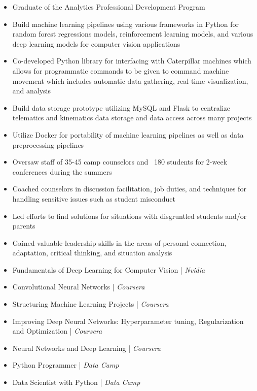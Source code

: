 \documentclass[10pt,a4paper]{altacv}
\begin{document}
\begin{itemize}
\item Graduate of the Analytics Professional Development Program
\item Build machine learning pipelines using various frameworks in Python for random forest regressions models, reinforcement learning models, and various deep learning models for computer vision applications
\item Co-developed Python library for interfacing with Caterpillar machines which allows for programmatic commands to be given to command machine movement which includes automatic data gathering, real-time visualization, and analysis
\item Build data storage prototype utilizing MySQL and Flask to centralize telematics and kinematics data storage and data access across many projects
\item Utilize Docker for portability of machine learning pipelines as well as data preprocessing pipelines

\end{itemize}

\begin{itemize}
\item Oversaw staff of 35-45 camp counselors and ~180 students for 2-week conferences during the summers
\item Coached counselors in discussion facilitation, job duties, and techniques for handling sensitive issues such as student misconduct
\item Led efforts to find solutions for situations with disgruntled students and/or parents
\item Gained valuable leadership skills in the areas of personal connection, adaptation, critical thinking, and situation analysis

\end{itemize}



\begin{itemize}
\item Fundamentals of Deep Learning for Computer Vision | \textit{Nvidia}
\item Convolutional Neural Networks | \textit{Coursera}
\item Structuring Machine Learning Projects | \textit{Coursera}
\item Improving Deep Neural Networks: Hyperparameter tuning, Regularization and Optimization | \textit{Coursera}
\item Neural Networks and Deep Learning | \textit{Coursera}
\item Python Programmer | \textit{Data Camp}
\item Data Scientist with Python | \textit{Data Camp}
\end{itemize}
\end{document}
